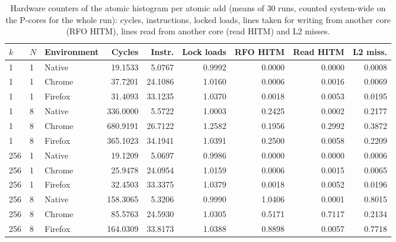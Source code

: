 \begin{table}[htbp]
\caption{Hardware counters of the atomic histogram per atomic add (means of 30 runs, counted system-wide on the P-cores for the whole run): cycles, instructions, locked loads, lines taken for writing from another core (RFO HITM), lines read from another core (read HITM) and L2 misses.}\label{tab:counters-atomic}
\centering\small
\begin{tabular}{lllrrrrrr}
\toprule
$k$ & $N$ & Environment & Cycles & Instr. & Lock loads & RFO HITM & Read HITM & L2 miss. \\
\midrule
1 & 1 & Native & 19.1533 & 5.0767 & 0.9992 & 0.0000 & 0.0000 & 0.0008 \\
1 & 1 & Chrome & 37.7201 & 24.1086 & 1.0160 & 0.0006 & 0.0016 & 0.0069 \\
1 & 1 & Firefox & 31.4093 & 33.1235 & 1.0370 & 0.0018 & 0.0053 & 0.0195 \\
\midrule
1 & 8 & Native & 336.0000 & 5.5722 & 1.0003 & 0.2425 & 0.0002 & 0.2177 \\
1 & 8 & Chrome & 680.9191 & 26.7122 & 1.2582 & 0.1956 & 0.2992 & 0.3872 \\
1 & 8 & Firefox & 365.1023 & 34.1941 & 1.0391 & 0.2500 & 0.0058 & 0.2209 \\
\midrule
256 & 1 & Native & 19.1209 & 5.0697 & 0.9986 & 0.0000 & 0.0000 & 0.0006 \\
256 & 1 & Chrome & 25.9478 & 24.0954 & 1.0159 & 0.0006 & 0.0015 & 0.0065 \\
256 & 1 & Firefox & 32.4503 & 33.3375 & 1.0379 & 0.0018 & 0.0052 & 0.0196 \\
\midrule
256 & 8 & Native & 158.3065 & 5.3206 & 0.9990 & 1.0406 & 0.0001 & 0.8015 \\
256 & 8 & Chrome & 85.5763 & 24.5930 & 1.0305 & 0.5171 & 0.7117 & 0.2134 \\
256 & 8 & Firefox & 164.0309 & 33.8173 & 1.0388 & 0.8898 & 0.0057 & 0.7718 \\
\bottomrule
\end{tabular}
\end{table}
